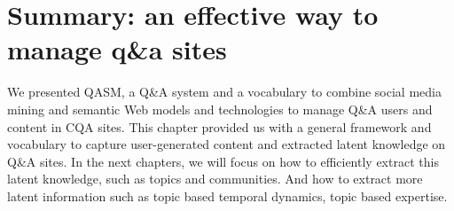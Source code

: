 
\section{Summary: an effective way to manage q\&a sites}
\label{sec:future}
We presented QASM, a Q\&A system and a vocabulary to combine social media mining and semantic Web models and technologies to manage Q\&A users and content in CQA sites. This chapter provided us with a general framework and vocabulary to capture user-generated content and extracted latent knowledge on Q\&A sites. In the next chapters, we will focus on how to efficiently extract this latent knowledge, such as topics and communities. And how to extract more latent information such as topic based temporal dynamics, topic based expertise.





